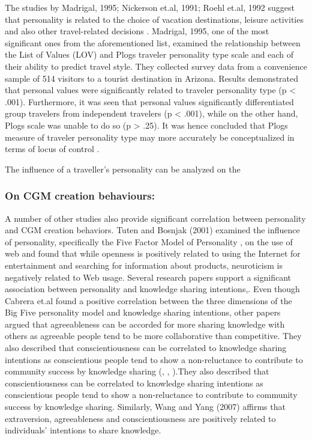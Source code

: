 The studies by Madrigal, 1995; Nickerson et.al, 1991; Roehl et.al, 1992 suggest that personality is related to the choice of vacation destinations, leisure activities and also other travel-related decisions \cite{madrigal1995personal}\cite{nickerson1991traveler}\cite{roehl1992risk}. Madrigal, 1995, one of the most significant ones from the aforementioned list, examined the relationship between the List of Values (LOV) and Plog\textquotesingle s traveler personality type scale and each of their ability to predict travel style. They collected survey data from a convenience sample of 514 visitors to a tourist destination in Arizona. Results demonstrated that personal values were significantly related to traveler personality type (p < .001). Furthermore, it was seen that personal values significantly differentiated group travelers from independent travelers (p < .001), while on the other hand, Plog\textquotesingle s scale was unable to do so (p > .25). It was hence concluded that Plog\textquotesingle s measure of traveler personality type may more accurately be conceptualized in terms of locus of control \cite{madrigal1995personal}.

The influence of a traveller's personality can be analyzed on the 
\subsubsection{On CGM creation behaviours: }

A number of other studies also provide significant correlation between personality and CGM creation behaviors. Tuten and Bosnjak (2001) examined the influence of personality, specifically the Five Factor Model of Personality \cite{goldberg1990alternative}, on the use of web and found that while openness is positively related to using the Internet for entertainment and searching for information about products, neuroticism is negatively related to Web usage. Several research papers support a significant association between personality and knowledge sharing intentions\cite{cabrera2006determinants}\cite{wang2007personality},\cite{matzler2011personality}\cite{yoo2011influence}. Even though Cabrera et.al found a positive correlation between the three dimensions of the Big Five personality model \cite{goldberg1990alternative} and knowledge sharing intentions, other papers argued that agreeableness can be accorded for more sharing knowledge with others as agreeable people tend to be more collaborative than competitive. They also described that conscientiousness can be correlated to knowledge sharing intentions as conscientious people tend to show a non-reluctance to contribute to community success by knowledge sharing (\cite{matzler2011personality},  \cite{barrick1991big}, \cite{liao2004multilevel}).They also described that conscientiousness can be correlated to knowledge sharing intentions as conscientious people tend to show a non-reluctance to contribute to community success by knowledge sharing. Similarly, Wang and Yang (2007) affirms that extraversion, agreeableness and conscientiousness are positively related to individuals’ intentions to share knowledge\cite{wang2007personality}.


